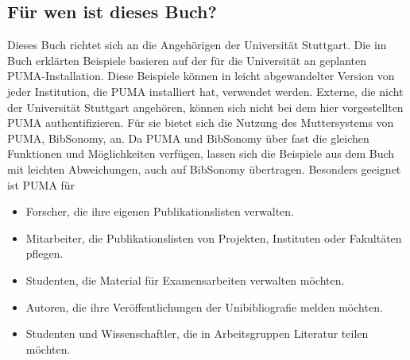\subsection{Für wen ist dieses Buch?} 
Dieses Buch richtet sich an die Angehörigen der Universität Stuttgart. Die im Buch erklärten Beispiele basieren auf der für die Universität  an geplanten PUMA-Installation. Diese Beispiele können in leicht abgewandelter Version von jeder Institution, die PUMA installiert hat, verwendet werden. \newline
Externe, die nicht der Universität Stuttgart angehören, können sich nicht bei dem hier vorgestellten PUMA authentifizieren. Für sie bietet sich die Nutzung des Muttersystems von PUMA, BibSonomy, an. Da PUMA und BibSonomy über fast die gleichen Funktionen und Möglichkeiten verfügen, lassen sich die Beispiele aus dem Buch mit leichten Abweichungen, auch auf BibSonomy übertragen.\newline
Besonders geeignet ist PUMA für
\begin{itemize}
\item Forscher, die ihre eigenen Publikationslisten verwalten.
\item Mitarbeiter, die Publikationslisten von Projekten, Instituten oder Fakultäten pflegen.
\item Studenten, die Material für Examensarbeiten verwalten möchten.
\item Autoren, die ihre Veröffentlichungen der Unibibliografie melden möchten.
\item Studenten und Wissenschaftler, die in Arbeitsgruppen Literatur teilen möchten.
\end{itemize}
